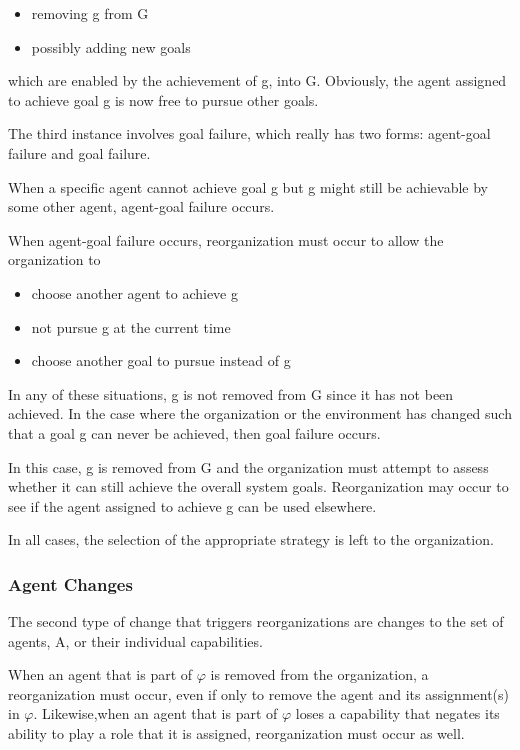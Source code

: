 \begin{itemize}
\item  removing g from G
\item  possibly adding new goals
\end{itemize}	

 which are enabled by the achievement of g, into G. Obviously, the agent assigned to achieve goal g is now free to pursue other goals. 

The third instance involves goal failure, which really has two forms: agent-goal failure and goal failure.

When a specific agent cannot achieve goal g but g might still be achievable by some other agent, 
agent-goal failure occurs. 

When agent-goal failure occurs, reorganization must occur to allow the organization to 

\begin{itemize}
\item  choose another agent to achieve g
\item  not pursue g at the current time
\item  choose another goal to pursue instead of g
\end{itemize}	
 
In any of these situations, g is not removed from G since it has not been achieved. In the case where the organization or the environment has changed such that a goal g can never be achieved, then goal failure occurs. 

In this case, g is removed from G and the organization must attempt to assess whether it can still achieve the overall system goals. Reorganization may occur to see if the agent assigned to achieve g can be used elsewhere. 

In all cases, the selection of the appropriate strategy is left to the organization. \cite{omacs2}

\subsubsection{Agent Changes }
The second type of change that triggers reorganizations are changes to the set of agents, A, or their individual capabilities.\cite{omacs2}

When an agent that is part of $\varphi$ is removed from the organization, a reorganization must occur, even if only to remove the agent and its assignment(s) in $\varphi$. Likewise,when an agent that is part of $\varphi$ loses a capability that negates its ability to play a role that it is assigned, reorganization must occur as well. 


